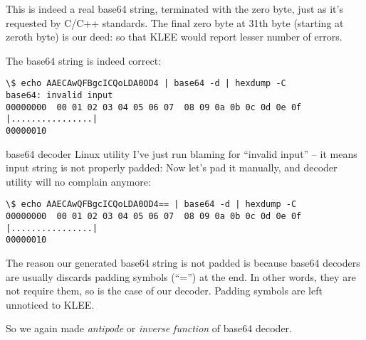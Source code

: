 This is indeed a real base64 string, terminated with the zero byte, just as it's requested by C/C++ standards.
The final zero byte at 31th byte (starting at zeroth byte) is our deed: so that KLEE would report lesser number of errors. %

The base64 string is indeed correct:

\begin{lstlisting}
\$ echo AAECAwQFBgcICQoLDA0OD4 | base64 -d | hexdump -C
base64: invalid input
00000000  00 01 02 03 04 05 06 07  08 09 0a 0b 0c 0d 0e 0f  |................|
00000010
\end{lstlisting}

base64 decoder Linux utility I've just run blaming for ``invalid input'' -- it means input string is not properly padded:
Now let's pad it manually, and decoder utility will no complain anymore:

\begin{lstlisting}
\$ echo AAECAwQFBgcICQoLDA0OD4== | base64 -d | hexdump -C
00000000  00 01 02 03 04 05 06 07  08 09 0a 0b 0c 0d 0e 0f  |................|
00000010
\end{lstlisting}

The reason our generated base64 string is not padded is because base64 decoders are usually discards padding symbols (``='') at the end.
In other words, they are not require them, so is the case of our decoder.
Padding symbols are left unnoticed to KLEE.

So we again made \textit{antipode} or \textit{inverse function} of base64 decoder.

